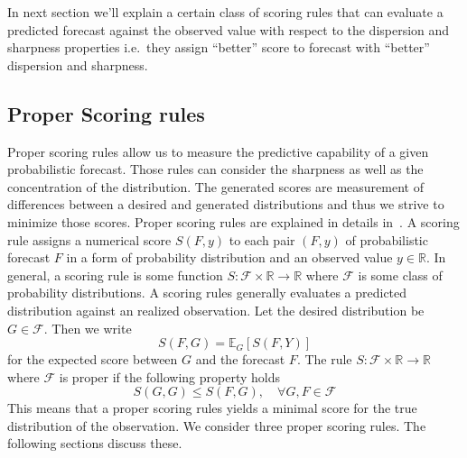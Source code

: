 \documentclass[12pt,a4paper,twoside]{scrartcl}
\numberwithin{equation}{section}
\begin{document}
In next section we'll explain a certain class of scoring rules that can evaluate a predicted forecast against the observed value with respect to the dispersion and sharpness properties i.e.\ they assign ``better'' score to forecast with ``better'' dispersion and sharpness.
\subsection{Proper Scoring rules}\label{sec:proper-scoring-rules}
Proper scoring rules allow us to measure the predictive capability of a given probabilistic forecast. Those rules can consider the sharpness as well as the concentration of the distribution. The generated scores are measurement of differences between a desired and generated distributions and thus we strive to minimize those scores. Proper scoring rules are explained in details in~\cite{gneiting2007}.
A scoring rule assigns a numerical score \(S(F, y)\) to each pair \((F, y)\) of probabilistic forecast \(F\) in a form of probability distribution and an observed value \(y \in \mathbb{R}\). In general, a scoring rule is some function \(S:\mathcal{F} \times \mathbb{R} \rightarrow \mathbb{R}\) where \(\mathcal{F}\) is some class of probability distributions. A scoring rules generally evaluates a predicted distribution against an realized observation. Let the desired distribution be \(G\in\mathcal{F}\). Then we write
\begin{equation}
  S(F,G) =\mathbb{E}_G[S(F,Y)]
\end{equation}
for the expected score between \(G\) and the forecast \(F\). 
The rule \(S: \mathcal{F} \times \mathbb{R} \rightarrow \mathbb{R}\) where \(\mathcal{F}\) is proper if the following property holds
\begin{equation}
  S(G,G) \leq S(F,G),\quad \forall G,F \in \mathcal{F}
\end{equation}
This means that a proper scoring rules yields a minimal score for the true distribution of the observation.
We consider three proper scoring rules. The following sections discuss these.
\end{document}
